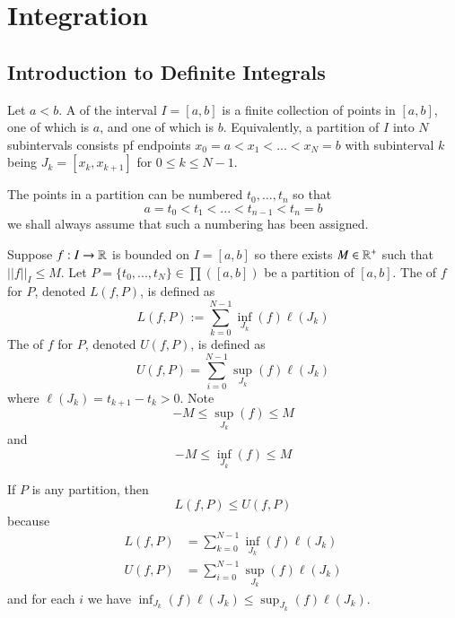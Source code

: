 \chapter{Integration}\label{Int}

\section{Introduction to Definite Integrals}

\begin{definition}
    Let $a < b$. A  of the interval $I= [a,b]$ is a finite collection of points in $[a,b]$, one of which is $a$, and one of which is $b$. Equivalently, a partition of $I$ into $N$ subintervals consists pf endpoints $x_0 = a<x_1 < ... < x_N = b$ with subinterval $k$ being $J_k = [x_k,x_{k+1}]$ for $0 \leq k \leq N-1$.
\end{definition}
The points in a partition can be numbered $t_0,...,t_n$ so that \begin{equation}
    a = t_0 < t_1 < ... < t_{n-1} < t_n = b
\end{equation}
we shall always assume that such a numbering has been assigned.

\begin{definition}
    Suppose $f:I\rightarrow \mathbb R$ is bounded on $I=[a,b]$ so there exists $M \in \mathbb R^+$ such that $||f||_I \leq M$. Let $P = \{t_0,...,t_N\} \in \prod([a,b])$ be a partition of $[a,b]$. The  of $f$ for $P$, denoted $L(f,P)$, is defined as \begin{equation}
        L(f,P) := \sum\limits_{k=0}^{N-1}\inf_{J_k}(f)\ell(J_k)
    \end{equation}
    The  of $f$ for $P$, denoted $U(f,P)$, is defined as \begin{equation}
        U(f,P) = \sum\limits_{i=0}^{N-1}\sup_{J_k}(f)\ell(J_k)
    \end{equation}
    where $\ell(J_k) = t_{k+1} - t_k > 0$. Note $$-M \leq \sup_{J_k}(f) \leq M$$ and $$-M\leq \inf_{J_k}(f) \leq M$$
\end{definition}


\begin{remark}
    If $P$ is any partition, then \begin{equation}
        L(f,P) \leq U(f,P)
    \end{equation}
    because \begin{align*}
        L(f,P) &= \sum\limits_{k=0}^{N-1}\inf_{J_k}(f)\ell(J_k) \\
        U(f,P) &= \sum\limits_{i=0}^{N-1}\sup_{J_k}(f)\ell(J_k)
    \end{align*}
    and for each $i$ we have $\inf_{J_k}(f)\ell(J_k) \leq \sup_{J_k}(f)\ell(J_k)$.
\end{remark}

